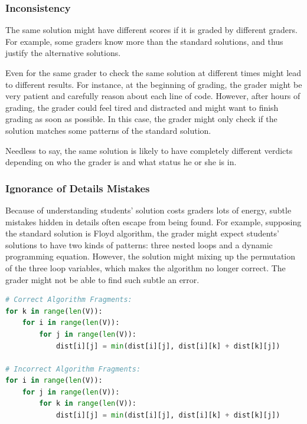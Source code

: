         \subsubsection{Inconsistency}

            The same solution might have different scores if it is graded by different graders.
            For example, some graders know more than the standard solutions,
            and thus justify the alternative solutions.

            Even for the same grader to check the same solution at different times might lead to different results.
            For instance, at the beginning of grading, the grader might be very patient
            and carefully reason about each line of code.
            However, after hours of grading, the grader could feel tired and distracted
            and might want to finish grading as soon as possible.
            In this case, the grader might only check if the solution matches some patterns of the standard solution.

            Needless to say, the same solution is likely to have completely different verdicts
            depending on who the grader is and what status he or she is in.

        \subsubsection{Ignorance of Details Mistakes}

            Because of understanding students' solution costs graders lots of energy,
            subtle mistakes hidden in details often escape from being found.
            For example, supposing the standard solution is Floyd algorithm, \cite{ingerman1962algorithm}
            the grader might expect students' solutions to have two kinds of patterns:
            three nested loops and a dynamic programming equation.
            However, the solution might mixing up the permutation of the three loop variables,
            which makes the algorithm no longer correct.
            The grader might not be able to find such subtle an error.

            \begin{lstlisting}[language=Python]
# Correct Algorithm Fragments:
for k in range(len(V)):
    for i in range(len(V)):
        for j in range(len(V)):
            dist[i][j] = min(dist[i][j], dist[i][k] + dist[k][j])

# Incorrect Algorithm Fragments:
for i in range(len(V)):
    for j in range(len(V)):
        for k in range(len(V)):
            dist[i][j] = min(dist[i][j], dist[i][k] + dist[k][j])
            \end{lstlisting}

